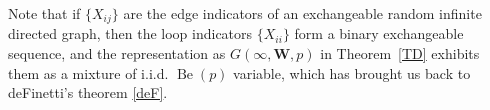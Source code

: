 \documentclass[11pt,reqno,tbtags]{amsart}
\numberwithin{equation}{section}
\theoremstyle{definition}
\theoremstyle{remark}
\newcommand{\refT}[1]{Theorem~\ref{#1}}
\newcommand\set[1]{\ensuremath{\{#1\}}}
\newcommand\iid{i.i.d.\spacefactor=1000}
\newcommand\Be{\operatorname{Be}}
\renewcommand{\=}{:=}
\newcommand{\exch}{exchangeable}
\newcommand{\gbwpx}[1]{G(#1,\bW,p)}
\newcommand{\gbwpoo}{\gbwpx\infty}
\newcommand{\bW}{\mathbf{W}}
\begin{document}
Note that if \set{X_{ij}} are the edge indicators of an \exch{} random
infinite directed graph, then the loop indicators \set{X_{ii}} form a
binary \exch{} sequence, and the representation as $\gbwpoo$ in
\refT{TD} exhibits them as a mixture of \iid{} $\Be(p)$ variable,
which has brought us back to deFinetti's theorem \ref{deF}.


\newcommand\AAP{\emph{Adv. Appl. Probab.} }
\newcommand\JAP{\emph{J. Appl. Probab.} }
\newcommand\JAMS{\emph{J. \AMS} }
\newcommand\MAMS{\emph{Memoirs \AMS} }
\newcommand\PAMS{\emph{Proc. \AMS} }
\newcommand\TAMS{\emph{Trans. \AMS} }
\newcommand\AnnMS{\emph{Ann. Math. Statist.} }
\newcommand\AnnPr{\emph{Ann. Probab.} }
\newcommand\CPC{\emph{Combin. Probab. Comput.} }
\newcommand\JMAA{\emph{J. Math. Anal. Appl.} }
\newcommand\RSA{\emph{Random Struct. Alg.} }
\newcommand\ZW{\emph{Z. Wahrsch. Verw. Gebiete} }
\newcommand\DMTCS{\jour{Discr. Math. Theor. Comput. Sci.} }

\newcommand\AMS{Amer. Math. Soc.}
\newcommand\Springer{Springer-Verlag}
\newcommand\Wiley{Wiley}

\newcommand\vol{\textbf}
\newcommand\jour{\emph}
\newcommand\book{\emph}
\newcommand\inbook{In \emph}
\def\no#1#2,{\unskip#2, no. #1,} %
\newcommand\toappear{\unskip, to appear}

\newcommand\webcite[1]{%
   \penalty1\texttt{\def~{{\tiny$\sim$}}#1}\hfill\hfill}
\newcommand\webcitesvante{\webcite{http://www.math.uu.se/~svante/papers/}}
\newcommand\arxiv[1]{\webcite{http://arxiv.org/#1}}

\def\nobibitem#1\par{}
\end{document}
